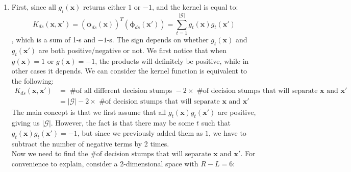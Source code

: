 \documentclass[11pt]{article}
\begin{document}
\begin{enumerate}[label=\textbf{\arabic*}.]
  \item First, since all $g_i(\mathbf{x})$ returns either $1$ or $-1$, and the kernel is equal to:
  \[K_{ds}(\mathbf{x}, \mathbf{x'})=(\bm{\phi}_{ds}(\mathbf{x}))^T (\bm{\phi}_{ds}(\mathbf{x'})) = \sum_{t=1}^{\mathcal{|G|}}g_t(\mathbf{x})g_t(\mathbf{x'})\]
  , which is a sum of 1-s and $-1$-s. The sign depends on whether $g_t(\mathbf{x})$ and $g_t(\mathbf{x'})$ are both positive/negative or not. We first notice that when $g(\mathbf{x}) = 1$ or $g(\mathbf{x}) = -1$, the products will definitely be positive, while in other cases it depends. We can consider the kernel function is equivalent to the following:\[\begin{aligned}K_{ds}(\mathbf{x}, \mathbf{x'})&= \text{ \# of all different decision stumps } - 2\times \text{ \# of decision stumps that will separate }\mathbf{x} \text{ and }\mathbf{x'} \\ & = |\mathcal{G}| - 2\times \text{ \# of decision stumps that will separate }\mathbf{x} \text{ and }\mathbf{x'} \end{aligned}\]
  The main concept is that we first assume that all $g_t(\mathbf{x})g_t(\mathbf{x'})$ are positive, giving us $|\mathcal{G}|$. However, the fact is that there may be some $t$ such that $g_t(\mathbf{x})g_t(\mathbf{x'}) = -1$, but since we previously added them as $1$, we have to subtract the number of negative terms by 2 times.\\
  Now we need to find the $\text{\# of decision stumps that will separate }\mathbf{x} \text{ and }\mathbf{x'}$. For convenience to explain, consider a 2-dimensional space with $R-L=6$:


\end{enumerate}
\end{document}
